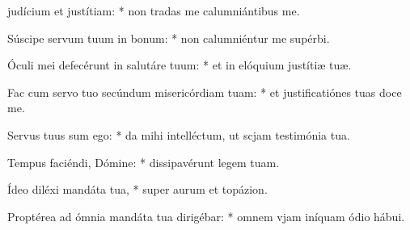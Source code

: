 \begin{psalmus}

 judícium et justítiam: * non tradas me calumniántibus me.

Súscipe servum tuum in bonum: * non calumniéntur me supérbi.

Óculi mei defecérunt in salutáre tuum: * et in elóquium justítiæ tuæ.

Fac cum servo tuo secúndum misericórdiam tuam: * et justificatiónes tuas doce me.

Servus tuus sum ego: * da mihi intelléctum, ut scjam testimónia tua.

Tempus faciéndi, Dómine: * dissipavérunt legem tuam.

Ídeo diléxi mandáta tua, * super aurum et topázion.

Proptérea ad ómnia mandáta tua dirigébar: * omnem vjam iníquam ódio hábui.

\end{psalmus}
